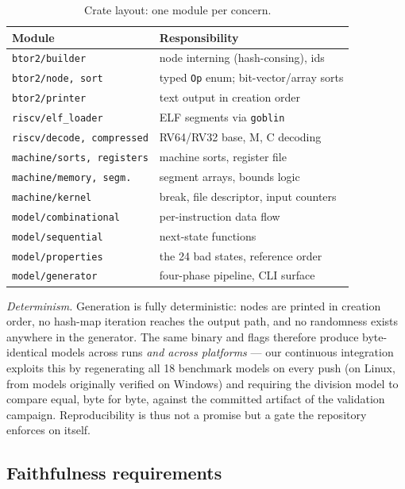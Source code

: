 \documentclass[sigplan,screen,nonacm]{acmart}
\begin{document}
\begin{table}[t]
\caption{Crate layout: one module per concern.}
\label{tab:modules}
\centering
\footnotesize
\setlength{\tabcolsep}{3.5pt}%
\begin{tabular}{ll}
\toprule
Module & Responsibility \\
\midrule
\texttt{btor2/builder} & node interning (hash-consing), ids \\
\texttt{btor2/node, sort} & typed \texttt{Op} enum; bit-vector/array sorts \\
\texttt{btor2/printer} & text output in creation order \\
\texttt{riscv/elf\_loader} & ELF segments via \texttt{goblin} \\
\texttt{riscv/decode, compressed} & RV64/RV32 base, M, C decoding \\
\texttt{machine/sorts, registers} & machine sorts, register file \\
\texttt{machine/memory, segm.} & segment arrays, bounds logic \\
\texttt{machine/kernel} & break, file descriptor, input counters \\
\texttt{model/combinational} & per-instruction data flow \\
\texttt{model/sequential} & next-state functions \\
\texttt{model/properties} & the 24 bad states, reference order \\
\texttt{model/generator} & four-phase pipeline, CLI surface \\
\bottomrule
\end{tabular}
\end{table}

\emph{Determinism.} Generation is fully deterministic: nodes are printed
in creation order, no hash-map iteration reaches the output path, and no
randomness exists anywhere in the generator. The same binary and flags
therefore produce byte-identical models across runs \emph{and across
platforms} --- our continuous integration exploits this by regenerating
all 18 benchmark models on every push (on Linux, from models originally
verified on Windows) and requiring the division model to compare equal,
byte for byte, against the committed artifact of the validation
campaign. Reproducibility is thus not a promise but a gate the
repository enforces on itself.

\subsection{Faithfulness requirements}
\label{sec:faithful}
\end{document}
